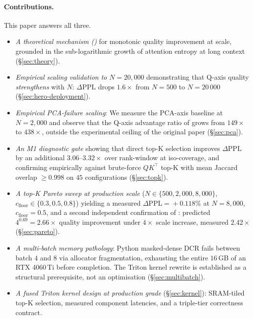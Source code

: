 \documentclass[11pt]{article}
\theoremstyle{definition}
\theoremstyle{remark}
\theoremstyle{plain}
\begin{document}
\paragraph{Contributions.}
This paper answers all three.
\begin{itemize}\setlength\itemsep{1pt}
  \item \emph{A theoretical mechanism ()} for monotonic quality
    improvement at scale, grounded in the sub-logarithmic growth of attention entropy
    at long context (§\ref{sec:theory}).
  \item \emph{Empirical scaling validation to $N\!=\!20{,}000$} demonstrating that
    Q-axis quality \emph{strengthens} with $N$: $\Delta\mathrm{PPL}$ drops $1.6\times$
    from $N\!=\!500$ to $N\!=\!20\,000$ (§\ref{sec:hero-deployment}).
  \item \emph{Empirical PCA-failure scaling}: We measure the PCA-axis baseline at
    $N\!=\!2{,}000$ and observe that the Q-axis advantage ratio of
    \citet{seqev2025qaxis} grows from $149\times$ to $438\times$, outside
    the experimental ceiling of the original paper (§\ref{sec:pca}).
  \item \emph{An M1 diagnostic gate} showing that direct top-K selection improves
    $\Delta\mathrm{PPL}$ by an additional $3.06$--$3.32\times$ over rank-window at
    iso-coverage, and confirming  empirically against brute-force
    $QK^\top$ top-K with mean Jaccard overlap $\geq 0.998$ on $45$ configurations
    (§\ref{sec:topk}).
  \item \emph{A top-K Pareto sweep at production scale} ($N\!\in\!\{500, 2{,}000,
    8{,}000\}$, $c_{\text{floor}}\!\in\!\{0.3, 0.5, 0.8\}$) yielding a measured
    $\Delta\mathrm{PPL}\!=\!+0.118\%$ at $N\!=\!8{,}000$, $c_{\text{floor}}\!=\!0.5$,
    and a second independent confirmation of : predicted
    $4^{0.69}\!=\!2.66\times$ quality improvement under $4\times$ scale increase,
    measured $2.42\times$ (§\ref{sec:pareto}).
  \item \emph{A multi-batch memory pathology}: Python masked-dense DCR fails between
    batch $4$ and $8$ via allocator fragmentation, exhausting the entire $16$\,GB
    of an RTX 4060\,Ti before completion. The Triton kernel rewrite is established
    as a structural prerequisite, not an optimisation (§\ref{sec:multibatch}).
  \item \emph{A fused Triton kernel design at production grade} (§\ref{sec:kernel}):
    SRAM-tiled top-K selection, measured component latencies, and a triple-tier
    correctness contract.
\end{itemize}
\end{document}
